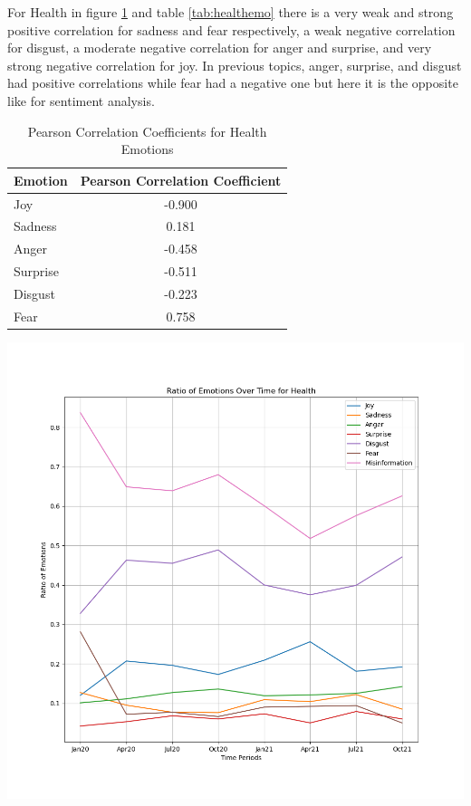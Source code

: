 \documentclass{l4proj}
\begin{document}
For Health in figure \ref{fig:healthemo} and table \ref{tab:healthemo} there is a very weak and strong positive correlation for sadness and fear respectively, a weak negative correlation for disgust, a moderate negative correlation for anger and surprise, and very strong negative correlation for joy. In previous topics, anger, surprise, and disgust had positive correlations while fear had a negative one but here it is the opposite like for sentiment analysis.

\begin{table}[H]
\begin{minipage}[c]{0.30\linewidth}
\centering
\begin{tabular}{@{}lc@{}}
\toprule
Emotion  & \multicolumn{1}{l}{Pearson Correlation Coefficient} \\ \midrule
Joy      & -0.900                                              \\
Sadness  & 0.181                                              \\
Anger    & -0.458                                               \\
Surprise & -0.511                                               \\
Disgust  & -0.223                                               \\
Fear     & 0.758                                              \\ \bottomrule
\end{tabular}
\caption{Pearson Correlation Coefficients for Health Emotions}
\label{tab:healthemo}
\end{minipage}\hfill
\begin{minipage}[c]{0.55\linewidth}
\centering
\includegraphics[width=\textwidth]{images/HealthEmotion.png}
\label{fig:healthemo}
\end{minipage}
\end{table}
\end{document}
